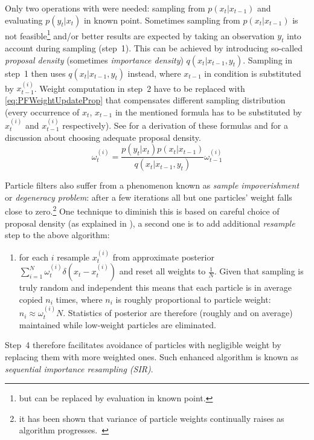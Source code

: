 Only two operations with {\pdfs} were needed: sampling from \(p(x_t|x_{t-1})\) and evaluating
\(p(y_t | x_t)\) in known point. Sometimes sampling from \(p(x_t|x_{t-1})\) is not
feasible\footnote{but can be replaced by evaluation in known point.} and/or better results are
expected by taking an observation \(y_t\) into account during sampling (step~1). This can be
achieved by introducing so-called \emph{proposal density} (sometimes \emph{importance density})
\(q(x_t|x_{t-1}, y_t)\). Sampling in step~1 then uses \(q(x_t|x_{t-1}, y_t)\) instead, where \(x_{t-1}\) in
condition is substituted by \(x_{t-1}^{(i)}\). Weight computation in step~2 have to be replaced with
\eqref{eq:PFWeightUpdateProp} that compensates different sampling distribution (every occurrence of
\(x_t\), \(x_{t-1}\) in the mentioned formula has to be substituted by \(x_t^{(i)}\) and \(x_{t-1}^{(i)}\)
respectively). See \cite{AruMasGor:02} for a derivation of these formulas and for a discussion about
choosing adequate proposal density.
\begin{equation} \label{eq:PFWeightUpdateProp}
	\omega_t^{(i)} = \frac{p(y_t|x_t)p(x_t|x_{t-1})}{q(x_t|x_{t-1}, y_t)} \omega_{t-1}^{(i)}
\end{equation}

Particle filters also suffer from a phenomenon known as \emph{sample impoverishment} or
\emph{degeneracy problem}: after a few iterations all but one particles' weight falls close to
zero.\footnote{it has been shown that variance of particle weights continually raises as algorithm
progresses.~\cite{AruMasGor:02}}
One technique to diminish this is based on careful choice of proposal density (as explained in
\cite{AruMasGor:02}), a second one is to add additional \emph{resample} step to the above
algorithm:
\begin{enumerate}[resume] %
	\item for each \(i\) resample \(x_t^{(i)}\) from approximate posterior {\pdf}
		\(\sum_{i=1}^N \omega_t^{(i)} \delta(x_t - x_t^{(i)})\) and reset all weights to \(\frac{1}{N}\).
		Given that sampling is truly random and independent this means that each particle is in
		average copied \(n_i\) times, where \(n_i\) is roughly proportional to particle weight:
		\(n_i \approx \omega_t^{(i)} N\). Statistics of posterior {\pdf} are therefore (roughly and
		on average) maintained while low-weight particles are eliminated.
\end{enumerate}
Step~4 therefore facilitates avoidance of particles with negligible weight by replacing them with more weighted
ones. Such enhanced algorithm is known as \emph{sequential importance resampling (SIR)}.

